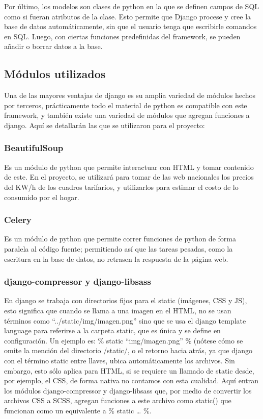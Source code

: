 Por último, los modelos son clases de python en la que se definen campos de SQL como si fueran atributos de la clase. Esto permite que Django procese y cree la base de datos automáticamente, sin que el usuario tenga que escribirle comandos en SQL. Luego, con ciertas funciones predefinidas del framework, se pueden añadir o borrar datos a la base.\\


\subsection{Módulos utilizados}

Una de las mayores ventajas de django es su amplia variedad de módulos hechos por terceros, prácticamente todo el material de python es compatible con este framework, y también existe una variedad de módulos que agregan funciones a django. Aquí se detallarán las que se utilizaron para el proyecto:\\

\subsubsection{BeautifulSoup}

Es un módulo de python que permite interactuar con HTML y tomar contenido de este. En el proyecto, se utilizará para tomar de las web nacionales los precios del KW/h de los cuadros tarifarios, y utilizarlos para estimar el costo de lo consumido por el hogar.\\

\subsubsection{Celery}

Es un módulo de python que permite correr funciones de python de forma paralela al código fuente; permitiendo así que las tareas pesadas, como la escritura en la base de datos, no retrasen la respuesta de la página web. \\

\subsubsection{django-compressor y django-libsass}

En django se trabaja con directorios fijos para el static (imágenes, CSS y JS), esto significa que cuando se llama a una imagen en el HTML, no se usan términos como “../static/img/imagen.png” sino que se usa el django template language para referirse a la carpeta static, que es única y se define en configuración. Un ejemplo es: {\% static “img/imagen.png” \%} (nótese cómo se omite la mención del directorio /static/, o el retorno hacia atrás, ya que django con el término static entre llaves, ubica automáticamente los archivos. Sin embargo, esto sólo aplica para HTML, si se requiere un llamado de static desde, por ejemplo, el CSS, de forma nativa no contamos con esta cualidad. Aquí entran los módulos django-compressor y django-libsass que, por medio de convertir los archivos CSS a SCSS, agregan funciones a este archivo como static() que funcionan como un equivalente a {\% static … \%}.

